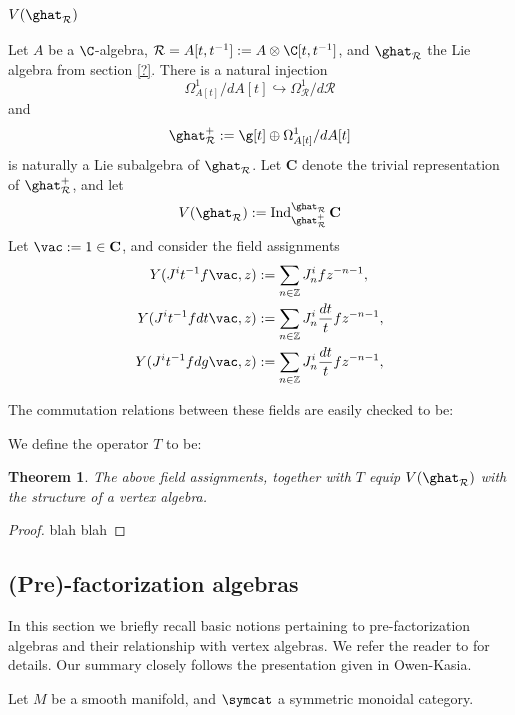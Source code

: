 \documentclass[12pt]{amsart}
\newtheorem{theorem}{Theorem}[section]
\theoremstyle{definition}
\theoremstyle{remark}
\newcommand{\on}{\operatorname}
\newcommand{\R}{\mathcal{R}}
\begin{document}
\subsubsection{$V(\ghat_{\R})$}

Let $A$ be a $\C$-algebra, $\R=A[t,t^{-1}] := A \otimes \C[t,t^{-1}]$, and $\ghat_{\R}$ the Lie algebra from section \ref{?}. There is a natural injection
\[
\Omega^1_{A[t]}/ d A[t] \hookrightarrow \Omega^{1}_{\R} / d \R
\]
and 
$$\ghat^{+}_{\R} := \g[t] \oplus \Omega^1_{A[t]}/ d A[t]  $$ is naturally a Lie subalgebra of $\ghat_{\R}$. Let $\mathbf{C}$ denote the trivial representation of $\ghat^{+}_{\R}$, and let
\begin{equation}
V(\ghat_{\R}) := \on{Ind}^{\ghat_{\R}}_{\ghat^+_{\R}} \mathbf{C}
\end{equation}
Let $\vac := 1 \in \mathbf{C}$, and consider the field assignments
\begin{align}
Y(J^{i}t^{-1}f \vac,z ) & := \sum_{n \in \mathbb{Z}} J^i_n f z^{-n-1}, \\
Y(J^{i}t^{-1}f dt \vac,z ) & := \sum_{n \in \mathbb{Z}} J^i_n \frac{dt}{t}  f z^{-n-1}, \\
Y(J^{i}t^{-1}f dg \vac,z ) & := \sum_{n \in \mathbb{Z}} J^i_n \frac{dt}{t}  f z^{-n-1}, \\
\end{align}

The commutation relations between these fields are easily checked to be:

We define the operator $T$ to be:

\begin{theorem}
The above field assignments, together with $T$ equip $V(\ghat_{\R})$ with the structure of a vertex algebra.
\end{theorem}

\begin{proof}
blah blah
\end{proof}

\subsection{(Pre)-factorization algebras}

In this section we briefly recall basic notions pertaining to pre-factorization algebras and their relationship with vertex algebras. We refer the reader to \cite{CG} for details. Our summary closely follows the presentation given in \cite{} {\color{red} Owen-Kasia}. 

Let $M$ be a smooth manifold, and $\symcat$ a symmetric monoidal category. 
\end{document}
